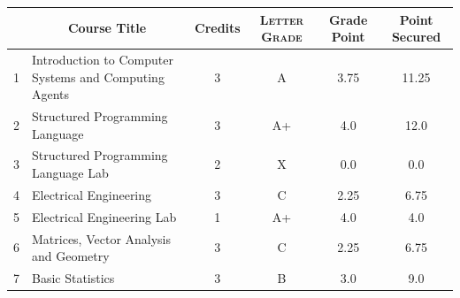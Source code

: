 \documentclass[11pt]{article}
\newcommand*{\numtwo}[1]{\pgfmathprintnumber[
                    fixed, precision=2, fixed zerofill=true]{#1}}
\begin{document}
                \begin{center}
                    \renewcommand{\arraystretch}{1.08}
                    
                \begin{tabular}{|c|l|c|>{\scshape}c|c|c|}
                \hline  \rule[-1ex]{0pt}{3.5ex} {\centering{\bf Course Code}} &  \multicolumn{1}{c|}{\textbf{Course Title}}  & {\bf Credits} & {\bf Letter Grade} & {\bf Grade Point} & {\bf Point Secured}  \\ 
                \hline   1 &  Introduction to Computer Systems and Computing Agents		 & 3 & A & 3.75 & 11.25 \\ %
                \hline   2 &  Structured Programming Language		 & 3 & A+ & 4.0 & 12.0 \\ %
                \hline   3 &  Structured Programming Language Lab		 & 2 & X & 0.0 & 0.0 \\ %
                \hline   4 &  Electrical Engineering		 & 3 & C & 2.25 & 6.75 \\ %
                \hline   5 &  Electrical Engineering Lab		 & 1 & A+ & 4.0 & 4.0 \\ %
                \hline   6 &  Matrices, Vector Analysis and Geometry		 & 3 & C & 2.25 & 6.75 \\ %
                \hline   7 &  Basic Statistics		 & 3 & B & 3.0 & 9.0 \\ %

\hline                %
                \end{tabular}
                \end{center}
                \renewcommand{\arraystretch}{1.03}
\end{document}
